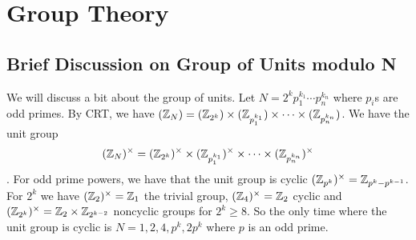 \chapter{Group Theory}
\section{Brief Discussion on Group of Units modulo N}\label{unit}
We will discuss a bit about the group of units. Let  $ N= 2^k p_1^{k_1}\cdots p_n^{k_n} $ where $ p_i $s are odd primes. By CRT, we have $ (\mathbb{Z}_N)= (\mathbb{Z}_{2^k})\times (\mathbb{Z}_{p_1^{k_1}}) \times \cdots\times (\mathbb{Z}_{p_n^{k_n}}) $. We have the unit group $$ (\mathbb{Z}_N)^\times= (\mathbb{Z}_{2^k})^\times\times (\mathbb{Z}_{p_1^{k_1}})^\times \times \cdots\times (\mathbb{Z}_{p_n^{k_n}})^\times $$. For odd prime powers, we have that the unit group is cyclic $ (\mathbb{Z}_{p^{k}})^\times = \mathbb{Z}_{p^k-p^{k-1}} $.\\
For $ 2^k $ we have $ (\mathbb{Z}_{2})^\times = \mathbb{Z}_1 $ the trivial group, $ (\mathbb{Z}_{4})^\times = \mathbb{Z}_2 $ cyclic and $ (\mathbb{Z}_{2^k})^\times = \mathbb{Z}_2 \times \mathbb{Z}_{2^{k-2}} $ noncyclic groups for $ 2^k\ge 8 $. So the only time where the unit group is cyclic is $ N=1,2,4,p^k, 2p^k $ where $ p $ is an odd prime.\\
